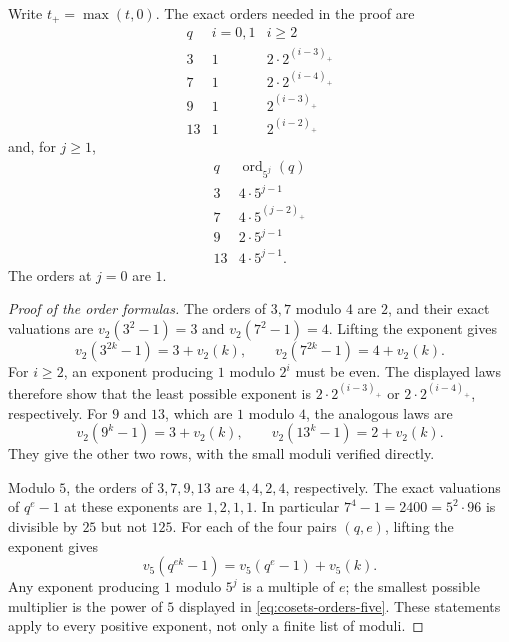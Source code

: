 Write $t_+=\max(t,0)$. The exact orders needed in the proof are
\begin{equation}\label{eq:cosets-orders-two}
\begin{array}{c|c|c}
q& i=0,1&i\ge2\\\hline
3&1&2\cdot2^{(i-3)_+}\\
7&1&2\cdot2^{(i-4)_+}\\
9&1&2^{(i-3)_+}\\
13&1&2^{(i-2)_+}
\end{array}
\end{equation}
and, for $j\ge1$,
\begin{equation}\label{eq:cosets-orders-five}
\begin{array}{c|c}
q&\operatorname{ord}_{5^j}(q)\\\hline
3&4\cdot5^{j-1}\\
7&4\cdot5^{(j-2)_+}\\
9&2\cdot5^{j-1}\\
13&4\cdot5^{j-1}.
\end{array}
\end{equation}
The orders at $j=0$ are $1$.

\begin{proof}[Proof of the order formulas]
The orders of $3,7$ modulo $4$ are $2$, and their exact valuations are
$v_2(3^2-1)=3$ and $v_2(7^2-1)=4$. Lifting the exponent gives
\[
 v_2(3^{2k}-1)=3+v_2(k),\qquad
 v_2(7^{2k}-1)=4+v_2(k).
\]
For $i\ge2$, an exponent producing $1$ modulo $2^i$ must be even.
The displayed laws therefore show that the least possible exponent is
$2\cdot2^{(i-3)_+}$ or $2\cdot2^{(i-4)_+}$, respectively.
For $9$ and $13$, which are $1$ modulo $4$, the analogous laws are
\[
 v_2(9^k-1)=3+v_2(k),\qquad
 v_2(13^k-1)=2+v_2(k).
\]
They give the other two rows, with the small moduli verified directly.

Modulo $5$, the orders of $3,7,9,13$ are $4,4,2,4$, respectively.
The exact valuations of $q^e-1$ at these exponents are $1,2,1,1$.
In particular $7^4-1=2400=5^2\cdot96$ is divisible by $25$ but
not $125$. For each of the four pairs $(q,e)$, lifting the exponent
gives
\[
 v_5(q^{ek}-1)=v_5(q^e-1)+v_5(k).
\]
Any exponent producing $1$ modulo $5^j$ is a multiple of $e$;
the smallest possible multiplier is the power of $5$ displayed in
\eqref{eq:cosets-orders-five}. These statements apply to every
positive exponent, not only a finite list of moduli.
\end{proof}

